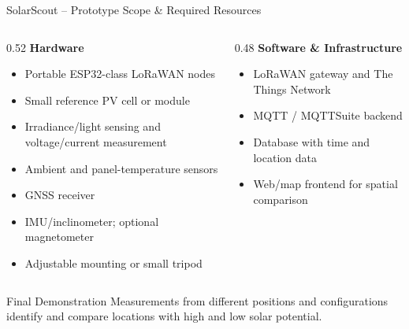 \begin{frame}{SolarScout -- Prototype Scope \& Required Resources}
\small
\begin{columns}[T,onlytextwidth]
    \begin{column}{0.52\textwidth}
        \textbf{Hardware}
        \begin{itemize}
            \item Portable ESP32-class LoRaWAN nodes
            \item Small reference PV cell or module
            \item Irradiance/light sensing and voltage/current measurement
            \item Ambient and panel-temperature sensors
            \item GNSS receiver
            \item IMU/inclinometer; optional magnetometer
            \item Adjustable mounting or small tripod
        \end{itemize}
    \end{column}
    \begin{column}{0.48\textwidth}
        \textbf{Software \& Infrastructure}
        \begin{itemize}
            \item LoRaWAN gateway and The Things Network
            \item MQTT / MQTTSuite backend
            \item Database with time and location data
            \item Web/map frontend for spatial comparison
        \end{itemize}
    \end{column}
\end{columns}

\begin{block}{Final Demonstration}
Measurements from different positions and configurations identify and compare locations with high and low solar potential.
\end{block}
\end{frame}
